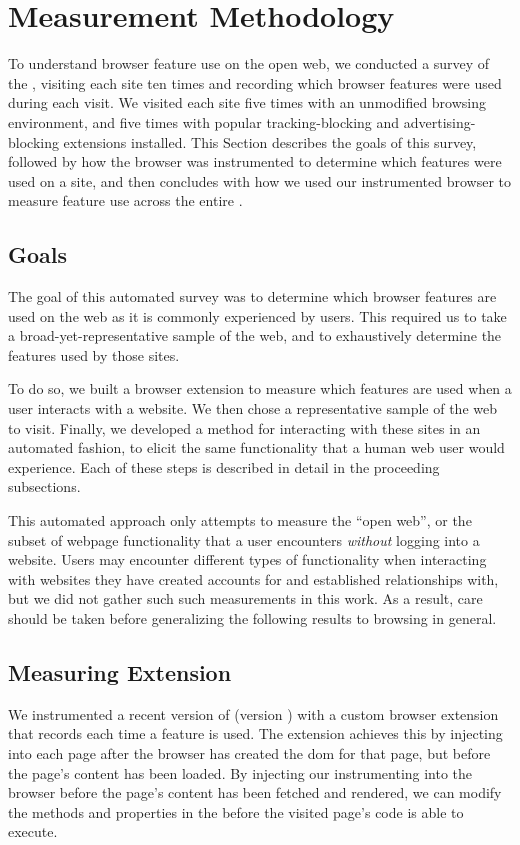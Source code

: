 \section{Measurement Methodology}
\label{measurement:methodology}

To understand browser feature use on the open web, we conducted a survey of the
\ATK, visiting each site ten times and recording which browser features
were used during each visit.  We visited each site five times with an
unmodified browsing environment, and five times with popular tracking-blocking
and advertising-blocking extensions installed.  This Section describes the
goals of this survey, followed by how the browser was instrumented to determine
which features were used on a site, and then concludes with how we used
our instrumented browser to measure feature use across the entire \ATK.


\subsection{Goals}
The goal of this automated survey was to determine which browser features
are used on the web as it is commonly experienced by users.  This required us
to take a broad-yet-representative sample of the web, and to exhaustively
determine the features used by those sites.

To do so, we built a browser extension to measure which features are used when
a user interacts with a website.  We then chose a representative sample of the
web to visit.  Finally, we developed a method for interacting with these sites
in an automated fashion, to elicit the same functionality that a human web user
would experience.  Each of these steps is described in detail in the proceeding
subsections.

This automated approach only attempts to measure the ``open web'', or the
subset of webpage functionality that a user encounters \textit{without} logging
into a website.  Users may encounter different types of functionality when
interacting with websites they have created accounts for and established
relationships with, but we did not gather such such measurements in
this work.  As a result, care should be taken before generalizing the following
results to browsing in general.


\subsection{Measuring Extension}
\label{measurement:methodology:measureextension}
We instrumented a recent version of \FF (version \FFversion) with a custom
browser extension that records each time a \JS feature is used.  The extension
achieves this by injecting \JS into each page after the browser has created the
\gls{dom} for that page, but before the page's content has been loaded. By
injecting our instrumenting \JS into the browser before the page's content has
been fetched and rendered, we can modify the methods and properties in the
\WAPI before the visited page's code is able to execute.

